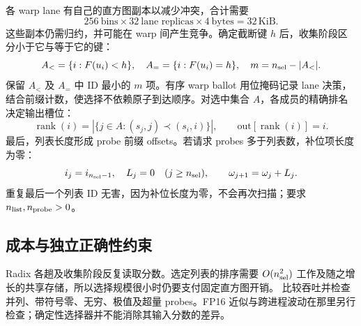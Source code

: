 各 warp lane 有自己的直方图副本以减少冲突，合计需要
\[
 256\ \text{bins}\times32\ \text{lane replicas}\times4\ \text{bytes}=32\,\mathrm{KiB}.
\]
这些副本仍需归约，并可能在 warp 间产生竞争。确定截断键 $h$ 后，收集阶段区分小于它与等于它的键：
\[
 A_< =\{i:F(u_i)<h\},\quad A_= =\{i:F(u_i)=h\},\quad
 m=n_{\rm sel}-|A_<|.
\]
保留 $A_<$ 及 $A_=$ 中 ID 最小的 $m$ 项。有序 warp ballot 用位掩码记录 lane 决策，结合前缀计数，使选择不依赖原子到达顺序。对选中集合 $A$，各成员的精确排名决定输出槽位：
\[
 \operatorname{rank}(i)=|\{j\in A:(s_j,j)\prec(s_i,i)\}|,
 \qquad\mathrm{out}[\operatorname{rank}(i)]=i.
\]
最后，列表长度形成 probe 前缀 offsets。若请求 probes 多于列表数，补位项长度为零：
\[
 i_j=i_{n_{\rm sel}-1},\quad L_j=0\quad(j\geq n_{\rm sel}),
 \qquad\omega_{j+1}=\omega_j+L_j.
\]
重复最后一个列表 ID 无害，因为补位长度为零，不会再次扫描；要求 $n_{\rm list},n_{\rm probe}>0$。

\subsection{成本与独立正确性约束}

Radix 各趟及收集阶段反复读取分数。选定列表的排序需要 $O(n_{\rm sel}^2)$ 工作及随之增长的共享存储，所以选择规模很小时仍要支付固定直方图开销。 比较吞吐并检查并列、带符号零、无穷、极值及超量 probes。FP16 近似与跨进程波动在那里另行检查；确定性选择器并不能消除其输入分数的差异。
